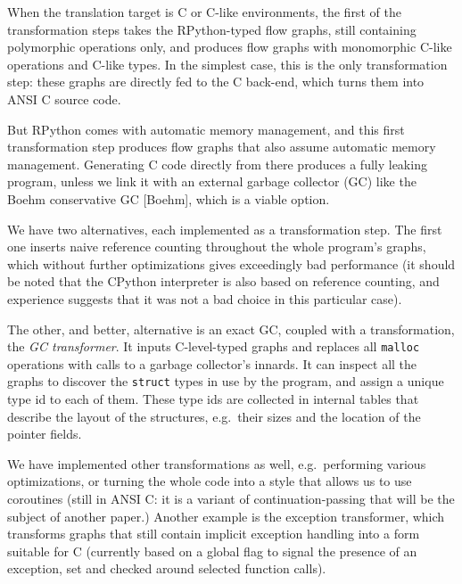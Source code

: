\documentclass{acm_proc_article-sp}
\begin{document}
When the translation target is C or C-like environments, the first of
the transformation steps takes the RPython-typed flow graphs, still
containing polymorphic operations only, and produces flow graphs with
monomorphic C-like operations and C-like types.  In the simplest case,
this is the only transformation step: these graphs are directly fed to
the C back-end, which turns them into ANSI C source code.

But RPython comes with automatic memory management, and this first
transformation step produces flow graphs that also assume automatic
memory management.  Generating C code directly from there produces a
fully leaking program, unless we link it with an external garbage
collector (GC) like the Boehm conservative GC [Boehm], which is a
viable option.

We have two alternatives, each implemented as a transformation step.
The first one inserts naive reference counting throughout the whole
program's graphs, which without further optimizations gives exceedingly
bad performance (it should be noted that the CPython interpreter is also
based on reference counting, and experience suggests that it was not a
bad choice in this particular case).

The other, and better, alternative is an exact GC, coupled with a
transformation, the \textit{GC transformer}.  It inputs C-level-typed graphs
and replaces all \texttt{malloc} operations with calls to a garbage
collector's innards.  It can inspect all the graphs to discover the
\texttt{struct} types in use by the program, and assign a unique type id to
each of them.  These type ids are collected in internal tables that
describe the layout of the structures, e.g.\ their sizes and the location
of the pointer fields.

We have implemented other transformations as well, e.g.\ performing
various optimizations, or turning the whole code into a style that
allows us to use coroutines (still in ANSI C: it is a variant of
continuation-passing that will be the subject of another paper.)
Another example is the exception transformer, which transforms graphs
that still contain implicit exception handling into a form suitable for
C (currently based on a global flag to signal the presence of an
exception, set and checked around selected function calls).
\end{document}
